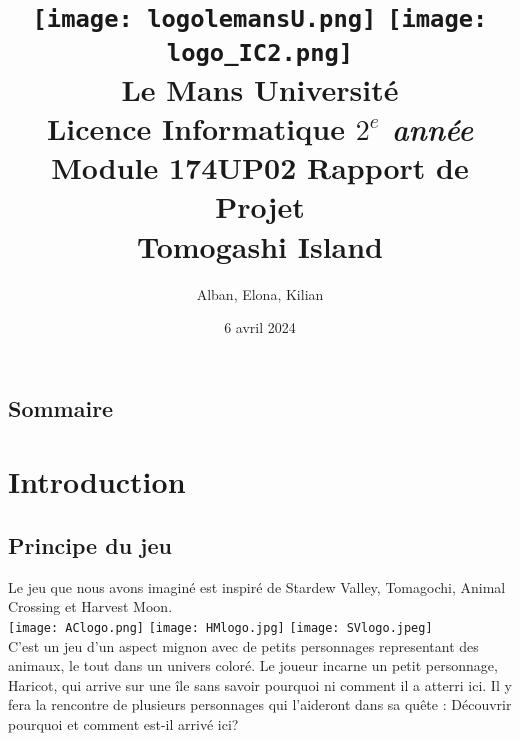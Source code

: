 \documentclass{article}
\begin{document}
\begin{titlepage}
    \title{
        \texttt{[image: logolemansU.png]}
        \hspace{150pt}
        \texttt{[image: logo\_IC2.png]}
        \\[2cm]
        \color{blue} \textbf{Le Mans Université} \\
        \color{black} Licence Informatique \textit{$2^{e}$ année} \\
        Module 174UP02 Rapport de Projet \\
        \textbf{Tomogashi Island}
    }
    \author{Alban, Elona, Kilian }
    \date{6 avril 2024}
    \maketitle
    
\end{titlepage}


\newpage
\begin{center}
\section*{Sommaire}
\tableofcontents
\end{center}


\newpage
\section{Introduction}
\subsection{Principe du jeu}

Le jeu que nous avons imaginé est inspiré de Stardew Valley, Tomagochi, Animal Crossing et Harvest Moon. 
\\
\texttt{[image: AClogo.png]}
\hspace{50pt}
\texttt{[image: HMlogo.jpg]}
\hspace{50pt}
\texttt{[image: SVlogo.jpeg]} 
\\
C'est un jeu d'un aspect mignon avec de petits personnages representant des animaux, le tout dans un univers coloré. Le joueur incarne un petit personnage, Haricot, qui arrive sur une île sans savoir pourquoi ni comment il a atterri ici. Il y fera la rencontre de plusieurs personnages qui l'aideront dans sa quête : Découvrir pourquoi et comment est-il arrivé ici? 
\\
\end{document}
